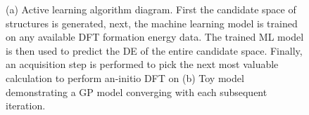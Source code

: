 \begin{figure}
\centering
{}
\caption{\label{fig:all_diagram}
(a) Active learning algorithm diagram.
First the candidate space of structures is generated,
next, the machine learning model is trained on any available DFT formation energy data.
The trained ML model is then used to predict the DE of the entire candidate space.
Finally, an acquisition step is performed to pick the next most valuable calculation to perform an-initio DFT on
(b) Toy model demonstrating a GP model converging with each subsequent iteration.
}
\end{figure}



